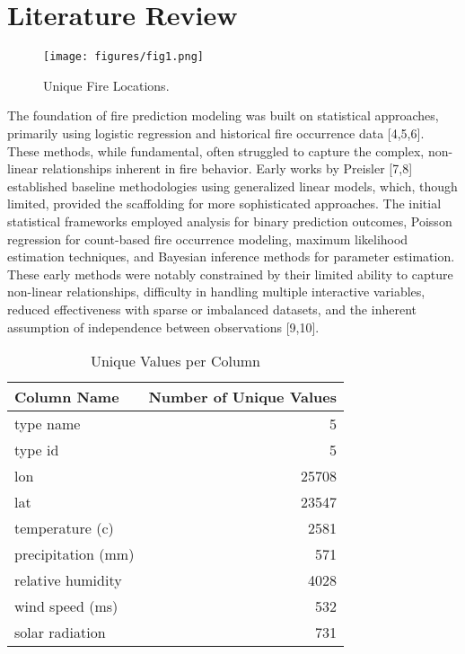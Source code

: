 \section{Literature Review}
\begin{figure}
\begin{center}
\texttt{[image: figures/fig1.png]}
\end{center}
\caption 
{ \label{fig1}
Unique Fire Locations.} 
\end{figure} 

The foundation of fire prediction modeling was built on statistical approaches, primarily using logistic regression and historical fire occurrence data [4,5,6]. These methods, while fundamental, often struggled to capture the complex, non-linear relationships inherent in fire behavior. Early works by Preisler [7,8] established baseline methodologies using generalized linear models, which, though limited, provided the scaffolding for more sophisticated approaches. The initial statistical frameworks employed analysis for binary prediction outcomes, Poisson regression for count-based fire occurrence modeling, maximum likelihood estimation techniques, and Bayesian inference methods for parameter estimation. These early methods were notably constrained by their limited ability to capture non-linear relationships, difficulty in handling multiple interactive variables, reduced effectiveness with sparse or imbalanced datasets, and the inherent assumption of independence between observations [9,10].

\begin{table}[ht!]
\centering
\caption{Unique Values per Column}
\small
\begin{tabular}{l r}
\toprule
Column Name & Number of Unique Values \\
\midrule
type name              & 5 \\
type id                & 5 \\
lon                    & 25708 \\
lat                    & 23547 \\
temperature (c)         & 2581 \\
precipitation (mm)      & 571 \\
relative humidity     & 4028 \\
wind speed (ms)         & 532 \\
solar radiation       & 731 \\
\bottomrule
\end{tabular}
\label{tab:unique_values}
\end{table}


